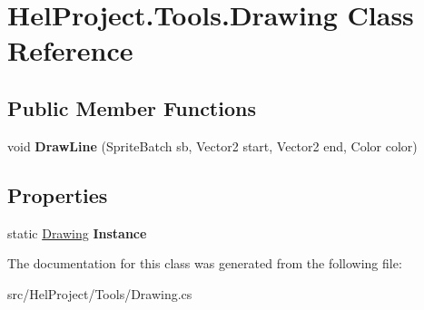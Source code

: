 \hypertarget{class_hel_project_1_1_tools_1_1_drawing}{}\section{Hel\+Project.\+Tools.\+Drawing Class Reference}
\label{class_hel_project_1_1_tools_1_1_drawing}
\subsection*{Public Member Functions}
\begin{DoxyCompactItemize}
\item 
\hypertarget{class_hel_project_1_1_tools_1_1_drawing_ad3e13f7bb047b0d3ff935f2c8f247cb9}{}void {\bfseries Draw\+Line} (Sprite\+Batch sb, Vector2 start, Vector2 end, Color color)\label{class_hel_project_1_1_tools_1_1_drawing_ad3e13f7bb047b0d3ff935f2c8f247cb9}

\end{DoxyCompactItemize}
\subsection*{Properties}
\begin{DoxyCompactItemize}
\item 
\hypertarget{class_hel_project_1_1_tools_1_1_drawing_a064986327912feaec4767acda390b7af}{}static \hyperlink{class_hel_project_1_1_tools_1_1_drawing}{Drawing} {\bfseries Instance}\label{class_hel_project_1_1_tools_1_1_drawing_a064986327912feaec4767acda390b7af}

\end{DoxyCompactItemize}


The documentation for this class was generated from the following file\+:\begin{DoxyCompactItemize}
\item 
src/\+Hel\+Project/\+Tools/Drawing.\+cs\end{DoxyCompactItemize}
